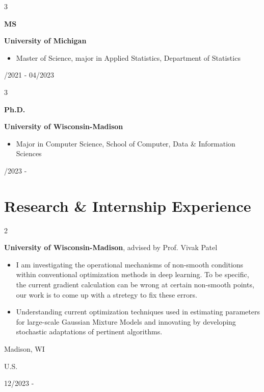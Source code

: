 \documentclass[10pt, letterpaper]{article}
\newenvironment{highlights}{
    \begin{itemize}[
        topsep=0.10 cm,
        parsep=0.10 cm,
        partopsep=0pt,
        itemsep=0pt,
        leftmargin=0.4 cm + 10pt
    ]
}{
    \end{itemize}
} %
\newenvironment{twocolentry}[2][]{
    \onecolentry
    \def\secondColumn{#2}
    \setcolumnwidth{\fill, 4.5 cm}
    \begin{paracol}{2}
}{
    \switchcolumn \raggedleft \secondColumn
    \end{paracol}
    \endonecolentry
} %
\newenvironment{threecolentry}[3][]{
    \onecolentry
    \def\thirdColumn{#3}
    \setcolumnwidth{1 cm, \fill, 4.5 cm}
    \begin{paracol}{3}
    {\raggedright #2} \switchcolumn
}{
    \switchcolumn \raggedleft \thirdColumn
    \end{paracol}
    \endonecolentry
} %
\begin{document}
        \begin{threecolentry}{\textbf{MS}}{
            08/2021 - 04/2023
        }
            \textbf{University of Michigan}
            \begin{highlights}
                \item Master of Science, major in Applied Statistics, Department of Statistics
            \end{highlights}
        \end{threecolentry}

        \begin{threecolentry}{\textbf{Ph.D.}}{
            08/2023 - 
        }
            \textbf{University of Wisconsin-Madison}
            \begin{highlights}
                \item Major in Computer Science, School of Computer, Data \& Information Sciences
            \end{highlights}
        \end{threecolentry}


    
    \section{Research \& Internship Experience}



        
        \begin{twocolentry}{
            Madison, WI

            U.S.

            12/2023 - 
        }
            \textbf{University of Wisconsin-Madison}, advised by Prof. Vivak Patel
            \begin{highlights}
                \item I am investigating the operational mechanisms of non-smooth conditions
                within conventional optimization methods in deep learning. To be specific, the current gradient 
                calculation can be wrong at certain non-smooth points, our work is to come up with a stretegy to 
                fix these errors.
                \item Understanding current optimization techniques used in estimating parameters for large-scale
                Gaussian Mixture Models and innovating by developing stochastic adaptations of pertinent
                algorithms. 
            \end{highlights}
        \end{twocolentry}
\end{document}
